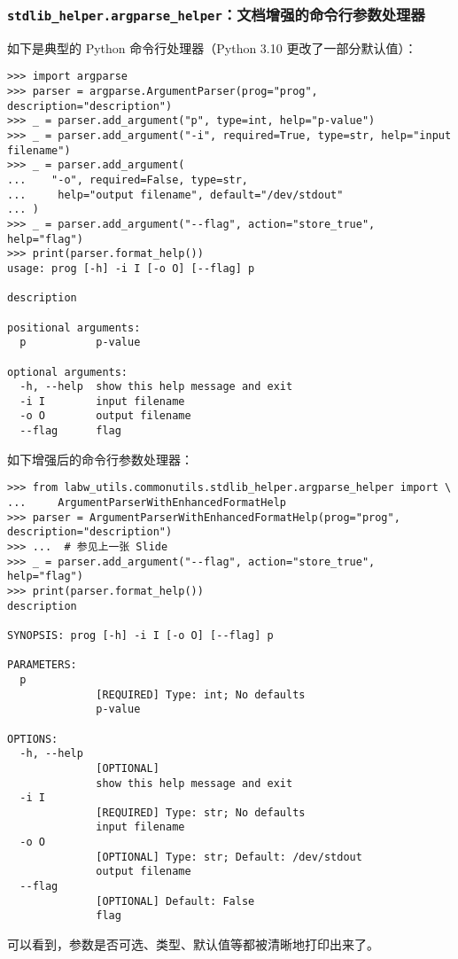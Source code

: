 \documentclass[pdf,9pt]{beamer}
\begin{document}
    \subsubsection{\texttt{stdlib\_helper.argparse\_helper}：文档增强的命令行参数处理器}

    \begin{frame}[fragile]{\subsubsecname}
        如下是典型的 Python 命令行处理器（Python 3.10 更改了一部分默认值）：

        \begin{verbatim}
>>> import argparse
>>> parser = argparse.ArgumentParser(prog="prog", description="description")
>>> _ = parser.add_argument("p", type=int, help="p-value")
>>> _ = parser.add_argument("-i", required=True, type=str, help="input filename")
>>> _ = parser.add_argument(
...    "-o", required=False, type=str,
...     help="output filename", default="/dev/stdout"
... )
>>> _ = parser.add_argument("--flag", action="store_true", help="flag")
>>> print(parser.format_help())
usage: prog [-h] -i I [-o O] [--flag] p

description

positional arguments:
  p           p-value

optional arguments:
  -h, --help  show this help message and exit
  -i I        input filename
  -o O        output filename
  --flag      flag

        \end{verbatim}
    \end{frame}
        
    \begin{frame}[fragile]{\subsubsecname}
        如下增强后的命令行参数处理器：

        \begin{verbatim}
>>> from labw_utils.commonutils.stdlib_helper.argparse_helper import \
...     ArgumentParserWithEnhancedFormatHelp
>>> parser = ArgumentParserWithEnhancedFormatHelp(prog="prog", description="description")
>>> ...  # 参见上一张 Slide
>>> _ = parser.add_argument("--flag", action="store_true", help="flag")
>>> print(parser.format_help())
description

SYNOPSIS: prog [-h] -i I [-o O] [--flag] p

PARAMETERS:
  p
              [REQUIRED] Type: int; No defaults
              p-value

OPTIONS:
  -h, --help
              [OPTIONAL]
              show this help message and exit
  -i I
              [REQUIRED] Type: str; No defaults
              input filename
  -o O
              [OPTIONAL] Type: str; Default: /dev/stdout
              output filename
  --flag
              [OPTIONAL] Default: False
              flag

        \end{verbatim}

        可以看到，参数是否可选、类型、默认值等都被清晰地打印出来了。
    \end{frame}
\end{document}
